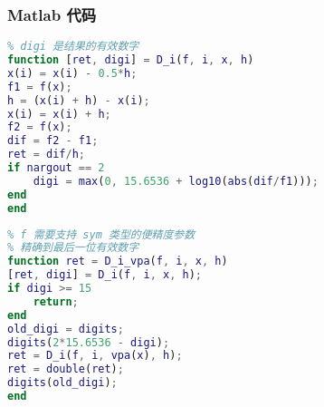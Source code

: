 \subsubsection{Matlab 代码}
\begin{lstlisting}[language=matlab]
% 数值偏偏导
% digi 是结果的有效数字
function [ret, digi] = D_i(f, i, x, h)
x(i) = x(i) - 0.5*h;
f1 = f(x);
h = (x(i) + h) - x(i);
x(i) = x(i) + h;
f2 = f(x);
dif = f2 - f1;
ret = dif/h;
if nargout == 2
    digi = max(0, 15.6536 + log10(abs(dif/f1)));
end
end
\end{lstlisting}

\begin{lstlisting}[language=matlab]
% 数值偏导 (变精度)
% f 需要支持 sym 类型的便精度参数
% 精确到最后一位有效数字
function ret = D_i_vpa(f, i, x, h)
[ret, digi] = D_i(f, i, x, h);
if digi >= 15
    return;
end
old_digi = digits;
digits(2*15.6536 - digi);
ret = D_i(f, i, vpa(x), h);
ret = double(ret);
digits(old_digi);
end
\end{lstlisting}
